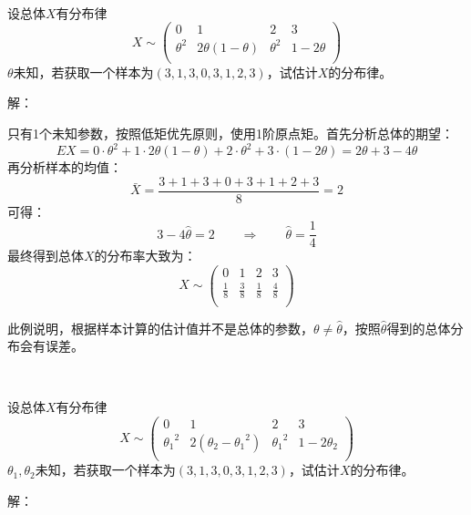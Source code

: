~

\begin{example}
设总体$X$有分布律
\[
X\sim \left( \begin{matrix}
	0&		1&		2&		3\\
	\theta ^2&		2\theta \left( 1-\theta \right)&		\theta ^2&		1-2\theta\\
\end{matrix} \right)
\]
$\theta $未知，若获取一个样本为$\left( 3,1,3,0,3,1,2,3 \right) $，试估计$X$的分布律。
\end{example}

解：

只有1个未知参数，按照低矩优先原则，使用1阶原点矩。首先分析总体的期望：
\[
EX=0\cdot \theta ^2+1\cdot 2\theta \left( 1-\theta \right) +2\cdot \theta ^2+3\cdot \left( 1-2\theta \right) =2\theta +3-4\theta
\]
再分析样本的均值：
\[
\bar{X}=\frac{3+1+3+0+3+1+2+3}{8}=2
\]
可得：
\[
3-4\hat{\theta}=2\qquad \Rightarrow \qquad \hat{\theta}=\frac{1}{4}
\]
最终得到总体$X$的分布率大致为：
\[
X\sim \left( \begin{matrix}
	0&		1&		2&		3\\
	\frac{1}{8}&		\frac{3}{8}&		\frac{1}{8}&		\frac{4}{8}\\
\end{matrix} \right)
\]

\begin{tcolorbox}
此例说明，根据样本计算的估计值并不是总体的参数，$\theta \ne \hat{\theta}$，按照$\hat{\theta}$得到的总体分布会有误差。
\end{tcolorbox}

~

\begin{example}
设总体$X$有分布律
\[
X\sim \left( \begin{matrix}
	0&		1&		2&		3\\
	{\theta _1}^2&		2\left( \theta _2-{\theta _1}^2 \right)&		{\theta _1}^2&		1-2\theta _2\\
\end{matrix} \right)
\]
$\theta _1,\theta _2$未知，若获取一个样本为$\left( 3,1,3,0,3,1,2,3 \right) $，试估计$X$的分布律。
\end{example}

解：

